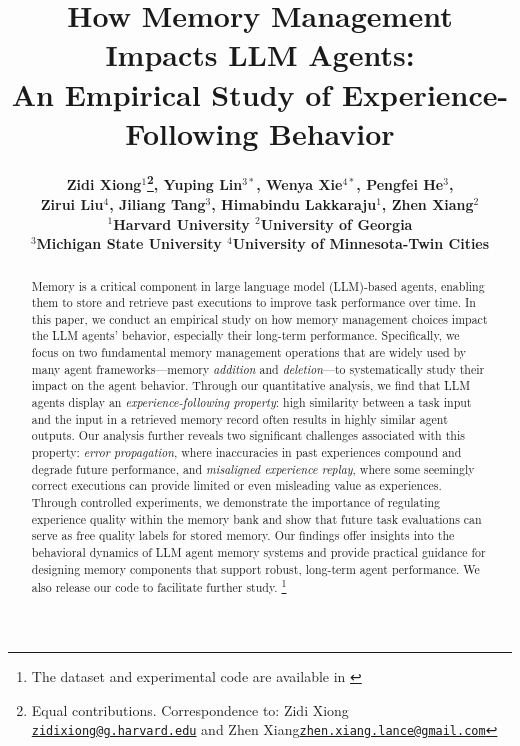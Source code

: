 \documentclass[11pt]{article}
\title{How Memory Management Impacts LLM Agents: \\ An Empirical Study of Experience-Following Behavior}
\author{
\bf Zidi Xiong$^{1}$\thanks{Equal contributions. Correspondence to: Zidi Xiong \href{mailto:zidixiong@g.harvard.edu}{\texttt{zidixiong@g.harvard.edu}} and Zhen Xiang\href{mailto:zhen.xiang.lance@gmail.com}{\texttt{zhen.xiang.lance@gmail.com}}},
Yuping Lin$^{3*}$,
Wenya Xie$^{4*}$,
Pengfei He$^{3}$, \\
\bf
Zirui Liu$^{4}$,
Jiliang Tang$^{3}$, 
Himabindu Lakkaraju$^{1}$, 
Zhen Xiang$^{2}$ \\
  $^1$Harvard University \quad
  $^2$University of Georgia \\
  $^3$Michigan State University\quad
  $^4$University of Minnesota-Twin Cities
 \\
}
\theoremstyle{plain}
\theoremstyle{definition}
\newcommand{\pf}[1]{\textcolor{brown}{[pf:#1]}}
\newcommand{\zhen}[1]{\textcolor{blue}{[Zhen: #1]}}
\begin{document}
\maketitle

\begin{abstract}
Memory is a critical component in large language model (LLM)-based agents, enabling them to store and retrieve past executions to improve task performance over time.
In this paper, we conduct an empirical study on how memory management choices impact the LLM agents' behavior, especially their long-term performance. 
Specifically, we focus on two fundamental memory management operations that are widely used by many agent frameworks—memory \textit{addition} and \textit{deletion}—to systematically study their impact on the agent behavior.
Through our quantitative analysis, we find that LLM agents display an \textit{experience-following property}: high similarity between a task input and the input in a retrieved memory record often results in highly similar agent outputs.
Our analysis further reveals two significant challenges associated with this property: \textit{error propagation}, where inaccuracies in past experiences compound and degrade future performance, and \textit{misaligned experience replay}, where some seemingly correct executions can provide limited or even misleading value as experiences.
Through controlled experiments, we demonstrate the importance of regulating experience quality within the memory bank and show that future task evaluations can serve as free quality labels for stored memory.
Our findings offer insights into the behavioral dynamics of LLM agent memory systems and provide practical guidance for designing memory components that support robust, long-term agent performance. 
We also release our code to facilitate further study. \footnote{The dataset and experimental code are available in \href{https://github.com/yuplin2333/agent_memory_manage.git}{}}


\end{abstract}
\end{document}
